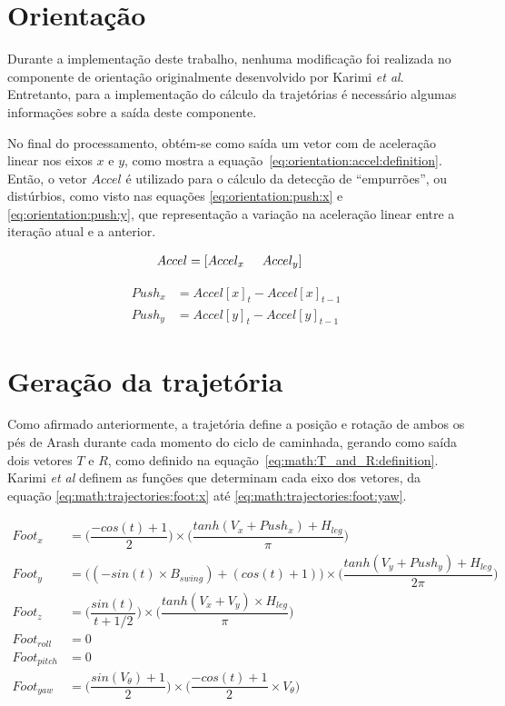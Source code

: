 \section{Orientação}
\label{sec:math:orientation}

Durante a implementação deste trabalho, nenhuma modificação foi realizada no componente de orientação originalmente desenvolvido por Karimi \textit{et al}. Entretanto, para a implementação do cálculo da trajetórias é necessário algumas informações sobre a saída deste componente.

No final do processamento, obtém-se como saída um vetor com de aceleração linear nos eixos $x$ e $y$, como mostra a equação~\ref{eq:orientation:accel:definition}. Então, o vetor $Accel$ é utilizado para o cálculo da detecção de ``empurrões'', ou distúrbios, como visto nas equações \ref{eq:orientation:push:x} e \ref{eq:orientation:push:y}, que representação a variação na aceleração linear entre a iteração atual e a anterior.

\begin{align}
	Accel &= [Accel_x \hspace{5mm} Accel_y] \label{eq:orientation:accel:definition}
\end{align}

\begin{align}
	Push_x &= Accel[x]_t - Accel[x]_{t-1} 	 \label{eq:orientation:push:x}   \\
	Push_y &= Accel[y]_t - Accel[y]_{t-1}     \label{eq:orientation:push:y}
\end{align}

\section{Geração da trajetória}
\label{sec:math:trajectories}

Como afirmado anteriormente, a trajetória define a posição e rotação de ambos os pés de Arash durante cada momento do ciclo de caminhada, gerando como saída dois vetores $T$ e $R$, como definido na equação~\ref{eq:math:T_and_R:definition}. Karimi \textit{et al} definem as funções que determinam cada eixo dos vetores, da equação \ref{eq:math:trajectories:foot:x} até \ref{eq:math:trajectories:foot:yaw}.

\begin{align}
      Foot_x &= \bigg(\dfrac{-cos(t) + 1}{2}\bigg) \times \bigg(\dfrac{tanh(V_x + Push_x) + H_{leg}}{\pi}\bigg)                    \label{eq:math:trajectories:foot:x}  \\
      Foot_y &= \big((-sin(t) \times B_{swing}) + (cos(t) + 1)\big) \times \bigg(\dfrac{tanh(V_y + Push_y) + H_{leg}}{2\pi}\bigg) \\
      Foot_z &= \bigg(\dfrac{sin(t)}{t + 1/2}\bigg) \times \bigg(\dfrac{tanh(V_x + V_y) \times H_{leg}}{\pi}\bigg) \\
 Foot_{roll} &= 0 \\
Foot_{pitch} &= 0 \\
  Foot_{yaw} &= \bigg(\dfrac{sin(V_\theta) + 1}{2}\bigg) \times \bigg(\dfrac{-cos(t) + 1}{2} \times V_\theta\bigg)     \label{eq:math:trajectories:foot:yaw}
\end{align}

